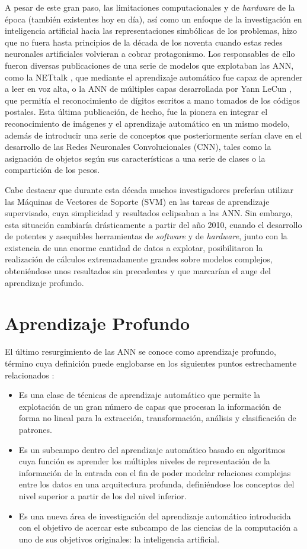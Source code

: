A pesar de este gran paso, las limitaciones computacionales y de \textit{hardware} de la época (también existentes hoy en día), así como un enfoque de la investigación en inteligencia artificial hacia las representaciones simbólicas de los problemas, hizo que no fuera hasta principios de la década de los noventa cuando estas redes neuronales artificiales volvieran a cobrar protagonismo. Los responsables de ello fueron diversas publicaciones de una serie de modelos que explotaban las ANN, como la NETtalk \cite{NETtalk}, que mediante el aprendizaje automático fue capaz de aprender a leer en voz alta, o la ANN de múltiples capas desarrollada por Yann LeCun \cite{MNIST}, que permitía el reconocimiento de dígitos escritos a mano tomados de los códigos postales. Esta última publicación, de hecho, fue la pionera en integrar el reconocimiento de imágenes y el aprendizaje automático en un mismo modelo, además de introducir una serie de conceptos que posteriormente serían clave en el desarrollo de las Redes Neuronales Convolucionales (CNN), tales como la asignación de objetos según sus características a una serie de clases o la compartición de los pesos.

Cabe destacar que durante esta década muchos investigadores preferían utilizar las Máquinas de Vectores de Soporte (SVM) en las tareas de aprendizaje supervisado, cuya simplicidad y resultados eclipsaban a las ANN. Sin embargo, esta situación cambiaría drásticamente a partir del año 2010, cuando el desarrollo de potentes y asequibles herramientas de \textit{software} y de \textit{hardware}, junto con la existencia de una enorme cantidad de datos a explotar, posibilitaron la realización de cálculos extremadamente grandes sobre modelos complejos, obteniéndose unos resultados sin precedentes y que marcarían el auge del aprendizaje profundo.

\section{Aprendizaje Profundo}

El último resurgimiento de las ANN se conoce como aprendizaje profundo, término cuya definición puede englobarse en los siguientes puntos estrechamente relacionados \cite{def:DeepLearning}:
\begin{itemize}
  \item Es una clase de técnicas de aprendizaje automático que permite la explotación de un gran número de capas que procesan la información de forma no lineal para la extracción, transformación, análisis  y clasificación de patrones.
  \item Es un subcampo dentro del aprendizaje automático basado en algoritmos cuya función es aprender los múltiples niveles de representación de la información de la entrada con el fin de poder modelar relaciones complejas entre los datos en una arquitectura profunda, definiéndose los conceptos del nivel superior a partir de los del nivel inferior.
  \item Es una nueva área de investigación del aprendizaje automático introducida con el objetivo de acercar este subcampo de las ciencias de la computación a uno de sus objetivos originales: la inteligencia artificial. 
\end{itemize}

